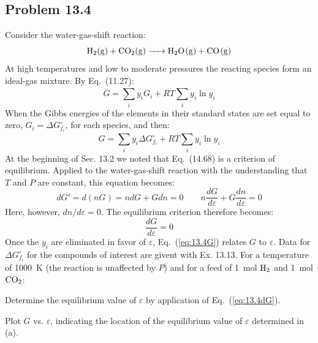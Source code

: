 \subsection*{Problem 13.4}
Consider the water-gas-shift reaction:
\begin{equation*}
  \ce{H2(g) + CO2(g) -> H2O(g) + CO(g)}
\end{equation*}
At high temperatures and low to moderate pressures the reacting
species form an ideal-gas mixture. By Eq.~(11.27):
\begin{equation*}
  G = \sum_{i}^{~}y_iG_i + RT\sum_{i}^{~}y_i\ln y_i
\end{equation*}
When the Gibbs energies of the elements in their standard states are
set equal to zero, \(G_i = \Delta G_{f_i}^\circ\), for each species, and then:
\begin{equation}
  \label{eq:13.4G}
  G = \sum_{i}^{~}y_i\Delta G_{f_i}^\circ + RT\sum_{i}^{~}y_i \ln y_i \tag{A}
\end{equation}
At the beginning of Sec. 13.2 we noted that Eq.~(14.68) is a
criterion of equilibrium. Applied to the water-gas-shift reaction
with the understanding that \(T\) and \(P\) are constant, this equation becomes:
\begin{equation*}
  dG' = d(nG) = ndG + Gdn = 0 \qquad n\frac{dG}{d\varepsilon} +
  G\frac{dn}{d\varepsilon} = 0
\end{equation*}
Here, however, \(dn/d\varepsilon = 0\). The equilibrium criterion
therefore becomes:
\begin{equation}
  \label{eq:13.4dG}
  \frac{dG}{d\varepsilon} = 0 \tag{B}
\end{equation}
Once the \(y_i\) are eliminated in favor of \(\varepsilon\),
Eq.~(\ref{eq:13.4G}) relates \(G\) to \(\varepsilon\). Data for
\(\Delta G_{f_i}^\circ\) for the compounds of interest are givent
with Ex. 13.13. For a temperature of 1000~\unit{\kelvin} (the
reaction is unaffected by \(P\)) and for a feed of 1~\unit{\mole}
\(\ce{H2}\) and 1~\unit{\mole} \(\ce{CO2}\):
\begin{abcls}
\item Determine the equilibrium value of \(\varepsilon\) by
  application of Eq.~(\ref{eq:13.4dG}).
\item Plot \(G\) vs. \(\varepsilon\), indicating the location of
  the equilibrium value of \(\varepsilon\) determined in (a).
\end{abcls}


